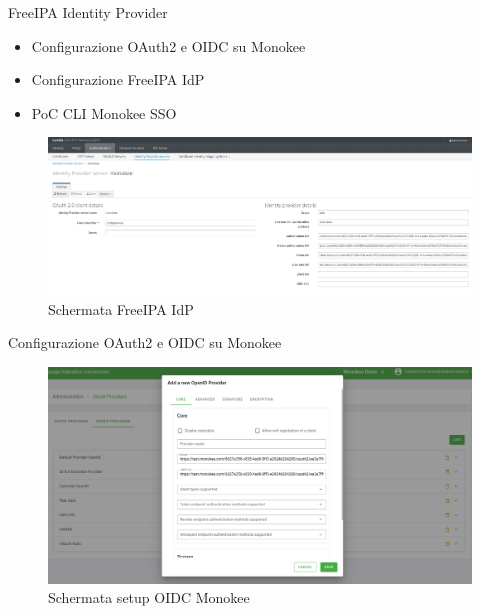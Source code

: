 \documentclass{beamer}
\begin{document}
	\begin{frame}{FreeIPA Identity Provider}
		
		\begin{itemize}
			\item Configurazione OAuth2 e OIDC su Monokee \vspace{.5em}
			\item Configurazione FreeIPA IdP \vspace{.5em}
			\item PoC CLI Monokee SSO \vspace{.5em}
		\end{itemize}
		\begin{figure}[H] 
			\centering 
			\includegraphics[width=\columnwidth]{immagini/appendici/ipa-idp.png} 
			\caption{Schermata FreeIPA IdP}
			\label{fig:ipa-idp}
		\end{figure}
		
	\end{frame}
	

	
	\begin{frame}{Configurazione OAuth2 e OIDC su Monokee}
		\begin{figure}[H] 
			\centering 
			\includegraphics[width=\columnwidth]{immagini/monokee-oidc.png} 
			\caption{Schermata setup OIDC Monokee}
			\label{fig:oidc-setup}
		\end{figure}
		
	\end{frame}
	
\end{document}
